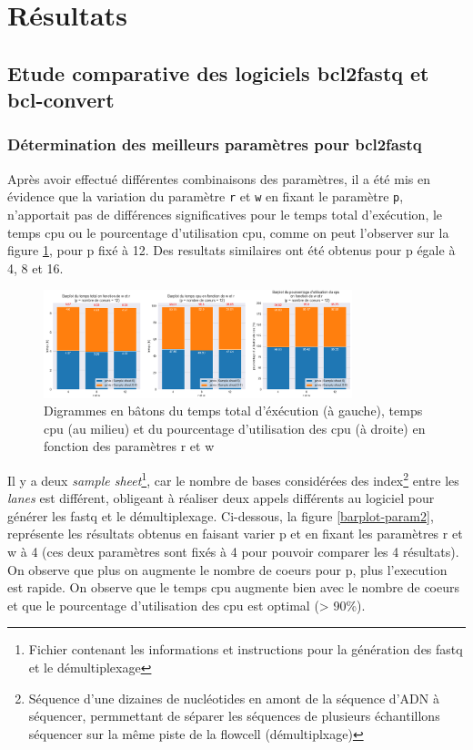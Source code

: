 \section{Résultats}
\subsection{Etude comparative des logiciels bcl2fastq et bcl-convert}
\subsubsection{Détermination des meilleurs paramètres pour bcl2fastq}
Après avoir effectué différentes combinaisons des paramètres, il a été mis en évidence que la variation du paramètre \texttt{r} et \texttt{w} en fixant le paramètre \texttt{p}, n'apportait pas de différences significatives pour le temps total d'exécution, le temps cpu ou le pourcentage d'utilisation cpu, comme on peut l'observer sur la figure \ref{barplot-param}, pour p fixé à 12. Des resultats similaires ont été obtenus pour p égale à 4, 8 et 16. 

\begin{figure}[H]
    \centering
    \includegraphics[width=0.8\textwidth]{img/barplot_cum_jarvis2.png}
    \caption{\footnotesize{Digrammes en bâtons du temps total d'éxécution (à gauche), temps cpu (au milieu) et du pourcentage d'utilisation des cpu (à droite) en fonction des paramètres r et w}}
    \label{barplot-param}
\end{figure}

Il y a deux \emph{sample sheet}\footnote{Fichier contenant les informations et instructions pour la génération des fastq et le démultiplexage}, car le nombre de bases considérées des index\footnote{Séquence d'une dizaines de nucléotides en amont de la séquence d'ADN à séquencer, permmettant de séparer les séquences de plusieurs échantillons séquencer sur la même piste de la flowcell (démultiplxage)} entre les \emph{lanes} est différent, obligeant à réaliser deux appels différents au logiciel pour générer les fastq et le démultiplexage. Ci-dessous, la figure \ref{barplot-param2}, représente les résultats obtenus en faisant varier p et en fixant les paramètres r et w à 4 (ces deux paramètres sont fixés à 4 pour pouvoir comparer les 4 résultats). On observe que plus on augmente le nombre de coeurs pour p, plus l'execution est rapide. On observe que le temps cpu augmente bien avec le nombre de coeurs et que le pourcentage d'utilisation des cpu est optimal (> 90\%).

